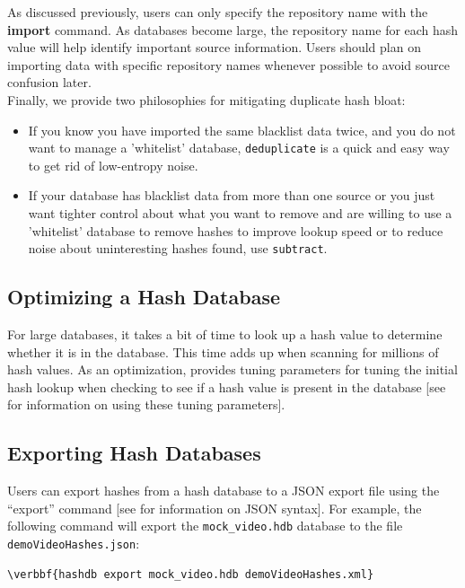 \documentclass[11pt,fleqn]{article} %
\begin{document}
As discussed previously, users can only specify the repository name with the \textbf{import} command. As databases become large, the repository name for each hash value will help identify important source information. Users should plan on importing data with specific repository names whenever possible to avoid source confusion later.\\

Finally, we provide two philosophies for mitigating duplicate hash bloat:
\begin{itemize}
 \item If you know you have imported the same blacklist data twice,
  and you do not want to manage a 'whitelist' database,
  \texttt{deduplicate} is a quick and easy way to get rid of low-entropy noise.
  \item If your database has blacklist data from more than one source
  or you just want tighter control about what you want to remove
  and are willing to use a 'whitelist' database
  to remove hashes to improve lookup speed
  or to reduce noise about uninteresting hashes found,
  use \texttt{subtract}.
\end{itemize}







\subsection{Optimizing a Hash Database}
\label{optimizing}
 
For large databases, it takes a bit of time to look up a hash value to determine whether it is in the database. This time adds up when scanning for millions of hash values. As an optimization, \hdb provides tuning parameters for tuning the initial hash lookup when checking to see if a hash value is present in the database [see \textbf{} for information on using these tuning parameters].

\subsection{Exporting Hash Databases}
Users can export hashes from a hash database to a JSON export file using the ``export'' command [see \textbf{} for information on JSON syntax].  For example, the following command will export the \texttt{mock\_video.hdb} database to the file \texttt{demoVideoHashes.json}:
\begin{Verbatim}[commandchars=\\\{\}]
\verbbf{hashdb export mock_video.hdb demoVideoHashes.xml}
\end{Verbatim}
\end{document}
